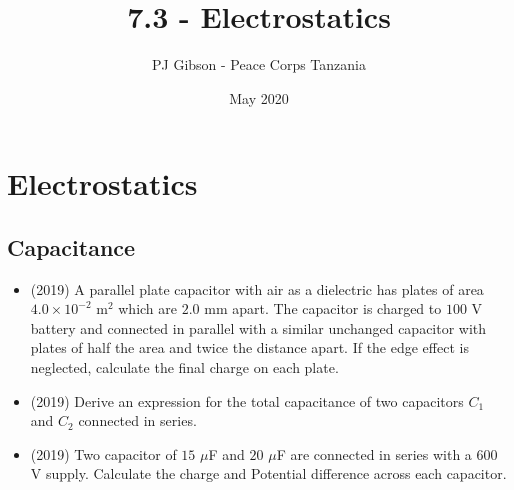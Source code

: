 \documentclass{article}
\title{7.3 - Electrostatics}
\author{PJ Gibson - Peace Corps Tanzania}
\date{May 2020}
\begin{document}
\maketitle


\section{Electrostatics}

\subsection{Capacitance}
\begin{itemize}
\item (2019)  A parallel plate capacitor with air as a dielectric has plates of area $ 4.0 \times 10^{-2}$ m$ ^{2}$ which are $ 2.0$ mm apart. The capacitor is charged to $ 100$ V battery and connected in parallel with a similar unchanged capacitor with plates of half the area and twice the distance apart. If the edge effect is neglected, calculate the final charge on each plate. 
\item (2019)  Derive an expression for the total capacitance of two capacitors $ C_{1}$ and $ C_{2}$ connected in series. 
\item (2019)  Two capacitor of $ 15$ $\mu$F and $ 20$ $\mu$F are connected in series with a $ 600$ V supply.  Calculate the charge and Potential difference across each capacitor. 
\end{itemize}
\end{document}
